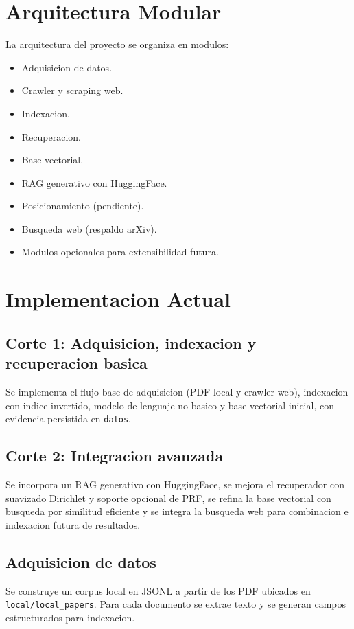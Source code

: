 \documentclass[runningheads]{llncs}
\begin{document}
\section{Arquitectura Modular}
La arquitectura del proyecto se organiza en modulos:
\begin{itemize}
\item Adquisicion de datos.
\item Crawler y scraping web.
\item Indexacion.
\item Recuperacion.
\item Base vectorial.
\item RAG generativo con HuggingFace.
\item Posicionamiento (pendiente).
\item Busqueda web (respaldo arXiv).
\item Modulos opcionales para extensibilidad futura.
\end{itemize}

\section{Implementacion Actual}
\subsection{Corte 1: Adquisicion, indexacion y recuperacion basica}
Se implementa el flujo base de adquisicion (PDF local y crawler web), indexacion
con indice invertido, modelo de lenguaje no basico y base vectorial inicial,
con evidencia persistida en \texttt{datos}.

\subsection{Corte 2: Integracion avanzada}
Se incorpora un RAG generativo con HuggingFace, se mejora el recuperador con
suavizado Dirichlet y soporte opcional de PRF, se refina la base vectorial con
busqueda por similitud eficiente y se integra la busqueda web para combinacion
e indexacion futura de resultados.

\subsection{Adquisicion de datos}
Se construye un corpus local en JSONL a partir de los PDF ubicados en
\texttt{local/local\_papers}. Para cada documento se extrae texto y se generan
campos estructurados para indexacion.
\end{document}
